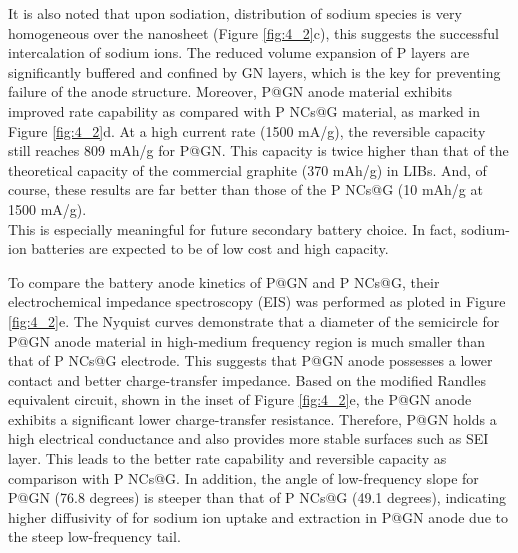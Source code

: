It is also noted that upon sodiation, distribution of sodium species is very homogeneous over the nanosheet (Figure \ref{fig:4_2}c), this suggests the successful intercalation of sodium ions. 
The reduced volume expansion of P layers are significantly buffered and confined by GN layers, which is the key for preventing failure of the anode structure. 
Moreover, P@GN anode material exhibits improved rate capability as compared with P NCs@G material, as marked in Figure \ref{fig:4_2}d. 
At a high current rate (1500 mA/g), the reversible capacity still reaches 809 mAh/g for P@GN. This capacity is twice higher than that of the theoretical capacity of the commercial graphite (370 mAh/g) in LIBs. And, of course, these results are far better than those of the P NCs@G (10 mAh/g at 1500 mA/g). \\
This is especially meaningful for future secondary battery choice. In fact, sodium-ion batteries are expected to be of low cost and high capacity. 

To compare the battery anode kinetics of P@GN and P NCs@G, their electrochemical impedance spectroscopy (EIS) was performed as ploted in Figure \ref{fig:4_2}e. The Nyquist curves demonstrate that a diameter of the semicircle for P@GN anode material in high-medium frequency region is much smaller than that of P NCs@G electrode. This suggests that P@GN anode possesses a lower contact and better charge-transfer impedance. Based on the modified Randles equivalent circuit, shown in the inset of Figure \ref{fig:4_2}e, the P@GN anode exhibits a significant lower charge-transfer resistance. Therefore, P@GN holds a high electrical conductance and also provides more stable surfaces such as SEI layer. This leads to the better rate capability and reversible capacity as comparison with P NCs@G. 
In addition, the angle of low-frequency slope for P@GN (76.8 degrees) is steeper than that of P NCs@G (49.1 degrees), indicating higher diffusivity of  for sodium ion uptake and extraction in P@GN anode due to the steep low-frequency tail.\cite{Sun2014b} \\

